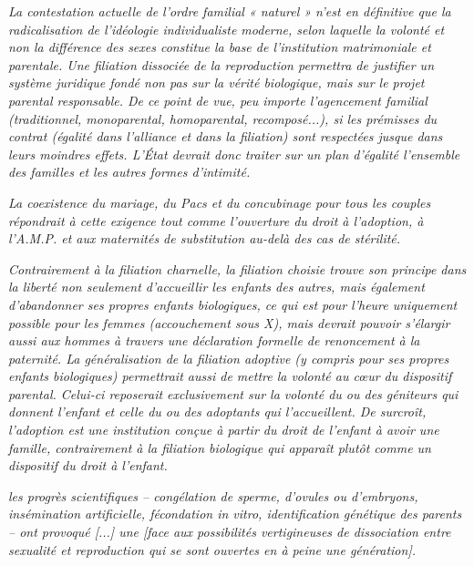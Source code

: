 \begin{displayquote}
\emph{La contestation actuelle de l'ordre familial « naturel » n'est en définitive que la radicalisation de l'idéologie individualiste moderne, selon laquelle la volonté et non la différence des sexes constitue la base de l'institution matrimoniale et parentale. Une filiation dissociée de la reproduction permettra de justifier un système juridique fondé non pas sur la vérité biologique, mais sur le projet parental responsable. De ce point de vue, peu importe l'agencement familial (traditionnel, monoparental, homoparental, recomposé...), si les prémisses du contrat (égalité dans l'alliance et dans la filiation) sont respectées jusque dans leurs moindres effets. L'État devrait donc traiter sur un plan d'égalité l'ensemble des familles et les autres formes d'intimité.}
 
\emph{La coexistence du mariage, du Pacs et du concubinage pour tous les couples répondrait à cette exigence tout comme l'ouverture du droit à l'adoption, à l'A.M.P. et aux maternités de substitution au-delà des cas de stérilité.}
 
\emph{Contrairement à la filiation charnelle, la filiation choisie trouve son principe dans la liberté non seulement d'accueillir les enfants des autres, mais également d'abandonner ses propres enfants biologiques, ce qui est pour l'heure uniquement possible pour les femmes (accouchement sous X), mais devrait pouvoir s'élargir aussi aux hommes à travers une déclaration formelle de renoncement à la paternité. La généralisation de la filiation adoptive (y compris pour ses propres enfants biologiques) permettrait aussi de mettre la volonté au cœur du dispositif parental. Celui-ci reposerait exclusivement sur la volonté du ou des géniteurs qui donnent l'enfant et celle du ou des adoptants qui l'accueillent. De surcroît, l'adoption est une institution conçue à partir du droit de l'enfant à avoir une famille, contrairement à la filiation biologique qui apparaît plutôt comme un dispositif du droit à l'enfant.}
 
\emph{les progrès scientifiques -- congélation de sperme, d'ovules ou d'embryons, insémination artificielle, fécondation in vitro, identification génétique des parents -- ont provoqué \emph{[...]} une  \emph{[face aux possibilités vertigineuses de dissociation entre sexualité et reproduction qui se sont ouvertes en à peine une génération]}.}
\end{displayquote}

